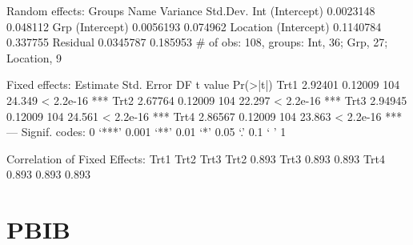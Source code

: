 \documentclass[12pt]{article}
\begin{document}
\begin{Schunk}
\begin{Soutput}
Random effects:
 Groups   Name        Variance  Std.Dev.
 Int      (Intercept) 0.0023148 0.048112
 Grp      (Intercept) 0.0056193 0.074962
 Location (Intercept) 0.1140784 0.337755
 Residual             0.0345787 0.185953
# of obs: 108, groups: Int, 36; Grp, 27; Location, 9

Fixed effects:
      Estimate Std. Error  DF t value  Pr(>|t|)    
Trt1   2.92401    0.12009 104  24.349 < 2.2e-16 ***
Trt2   2.67764    0.12009 104  22.297 < 2.2e-16 ***
Trt3   2.94945    0.12009 104  24.561 < 2.2e-16 ***
Trt4   2.86567    0.12009 104  23.863 < 2.2e-16 ***
---
Signif. codes:  0 `***' 0.001 `**' 0.01 `*' 0.05 `.' 0.1 ` ' 1 

Correlation of Fixed Effects:
     Trt1  Trt2  Trt3 
Trt2 0.893            
Trt3 0.893 0.893      
Trt4 0.893 0.893 0.893
\end{Soutput}
\end{Schunk}


\section{PBIB}
\label{sec:PBIB}
\end{document}
